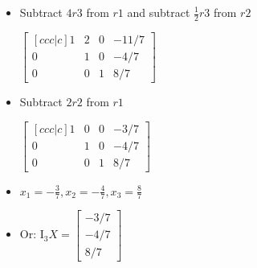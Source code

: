 \begin{itemize}
\begin{itemize}
        \item Subtract $4r3$ from $r1$ and subtract $\frac{1}{2}r3$ from $r2$
        
        \begin{center}
            $\begin{bmatrix}[ccc|c]
                1 & 2 & 0 & -11/7 \\
                0 & 1 & 0 & -4/7 \\
                0 & 0 & 1 & 8/7
            \end{bmatrix}$
        \end{center}

        \item Subtract $2r2$ from $r1$
    
        \begin{center}
            $\begin{bmatrix}[ccc|c]
                1 & 0 & 0 & -3/7 \\
                0 & 1 & 0 & -4/7 \\
                0 & 0 & 1 & 8/7
            \end{bmatrix}$
        \end{center}

        \item $x_1 = -\frac{3}{7}, x_2 = -\frac{4}{7}, x_3 = \frac{8}{7}$ 
        \item Or: $\text{I}_3X = \begin{bmatrix}
            -3/7 \\ -4/7 \\ 8/7
        \end{bmatrix}$

    \end{itemize}
\end{itemize}